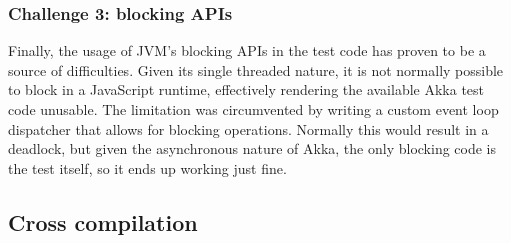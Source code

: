 \documentclass{sig-alternate}
\begin{document}
\subsubsection{Challenge 3: blocking APIs}

Finally, the usage of JVM's blocking APIs in the test code has proven to be a source of difficulties. Given its single threaded nature, it is not normally possible to block in a JavaScript runtime, effectively rendering the available Akka test code unusable. The limitation was circumvented by writing a custom event loop dispatcher that allows for blocking operations. Normally this would result
in a deadlock, but given the asynchronous nature of Akka, the only blocking code is the test itself, so it ends up working just fine.

\subsection{Cross compilation}\label{sec:cross-compilation}
\end{document}

